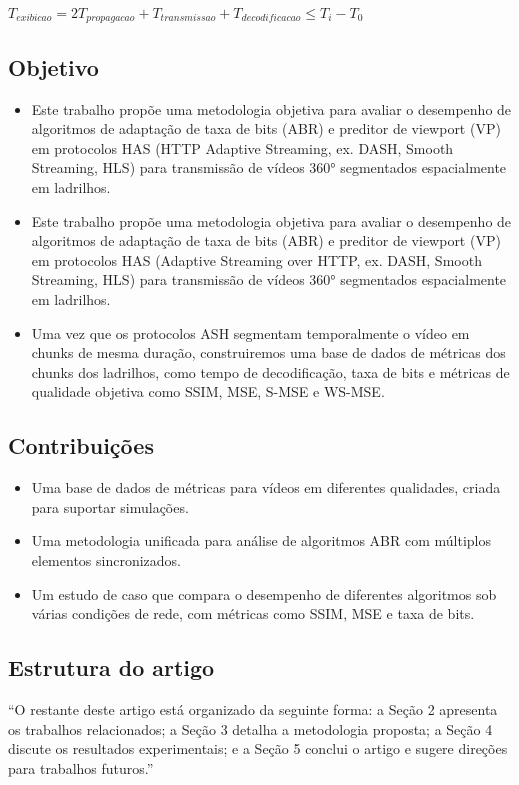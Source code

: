 \begin{math}
	T_{exibicao} = 2T_{propagacao} + T_{transmissao} + T_{decodificacao} \leq T_i - T_0
\end{math}

\subsection{Objetivo}

\begin{itemize}
	\item Este trabalho propõe uma metodologia objetiva para avaliar o desempenho de algoritmos de adaptação de taxa de bits (ABR) e preditor de viewport (VP) em protocolos HAS (HTTP Adaptive Streaming, ex. DASH, Smooth Streaming, HLS) para transmissão de vídeos 360° segmentados espacialmente em ladrilhos.
	\item Este trabalho propõe uma metodologia objetiva para avaliar o desempenho de algoritmos de adaptação de taxa de bits (ABR) e preditor de viewport (VP) em protocolos HAS (Adaptive Streaming over HTTP, ex. DASH, Smooth Streaming, HLS) para transmissão de vídeos 360° segmentados espacialmente em ladrilhos.
	\item Uma vez que os protocolos ASH segmentam temporalmente o vídeo em chunks de mesma duração, construiremos uma base de dados de métricas dos chunks dos ladrilhos, como tempo de decodificação, taxa de bits e métricas de qualidade objetiva como SSIM, MSE, S-MSE e WS-MSE.
\end{itemize}

\subsection{Contribuições}

\begin{itemize}
	\item Uma base de dados de métricas para vídeos em diferentes qualidades, criada para suportar simulações.
	\item Uma metodologia unificada para análise de algoritmos ABR com múltiplos elementos sincronizados.
	\item Um estudo de caso que compara o desempenho de diferentes algoritmos sob várias condições de rede, com métricas como SSIM, MSE e taxa de bits.
\end{itemize}

\subsection{Estrutura do artigo}

``O restante deste artigo está organizado da seguinte forma: a Seção 2 apresenta os trabalhos relacionados; a Seção 3 detalha a metodologia proposta; a Seção 4 discute os resultados experimentais; e a Seção 5 conclui o artigo e sugere direções para trabalhos futuros.''
